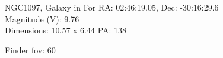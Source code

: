 \begin{block}{NGC1097, Galaxy in For}
    RA: 02:46:19.05, Dec: -30:16:29.6 \\ 
    Magnitude (V): 9.76 \\ 
    Dimensions: 10.57 x 6.44 PA: 138 

    Finder fov: 60 
\end{block}